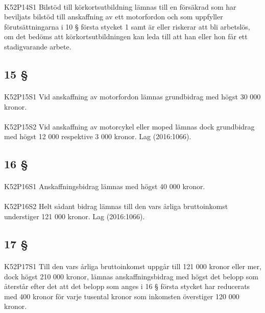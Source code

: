 \documentclass[a4paper,notitlepage,openany,10pt]{book}
\begin{document}
\paragraph*{}
{\tiny K52P14S1}
Bilstöd till körkortsutbildning lämnas till en försäkrad som har beviljats bilstöd till anskaffning av ett motorfordon och som uppfyller förutsättningarna i 10 § första stycket 1 samt är eller riskerar att bli arbetslös, om det bedöms att körkortsutbildningen kan leda till att han eller hon får ett stadigvarande arbete.
\subsection*{15 §}
\paragraph*{}
{\tiny K52P15S1}
Vid anskaffning av motorfordon lämnas grundbidrag med högst 30 000 kronor.
\paragraph*{}
{\tiny K52P15S2}
Vid anskaffning av motorcykel eller moped lämnas dock grundbidrag med högst 12 000 respektive 3 000 kronor.
Lag (2016:1066).
\subsection*{16 §}
\paragraph*{}
{\tiny K52P16S1}
Anskaffningsbidrag lämnas med högst 40 000 kronor.
\paragraph*{}
{\tiny K52P16S2}
Helt sådant bidrag lämnas till den vars årliga bruttoinkomst understiger 121 000 kronor.
Lag (2016:1066).
\subsection*{17 §}
\paragraph*{}
{\tiny K52P17S1}
Till den vars årliga bruttoinkomst uppgår till 121 000 kronor eller mer, dock högst 210 000 kronor, lämnas anskaffningsbidrag med högst det belopp som återstår efter det att det belopp som anges i 16 § första stycket har reducerats med 400 kronor för varje tusental kronor som inkomsten överstiger 120 000 kronor.
\end{document}
